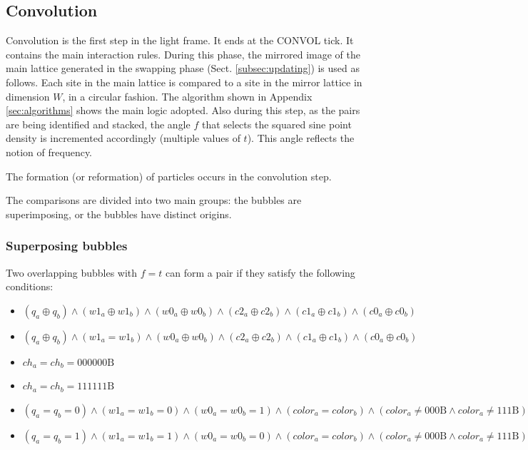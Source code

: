 \documentclass[12pt,english]{article}
\begin{document}
\subsection{Convolution} \label{subsec:convolution}
Convolution is the first step in the light frame. It ends at the CONVOL tick. It contains the main interaction rules. During this phase, the mirrored image of the main lattice generated in the swapping phase (Sect. \ref{subsec:updating}) is used as follows. Each site in the main lattice is compared to a site in the mirror lattice in dimension $W$, in a circular fashion. The algorithm shown in Appendix \ref{sec:algorithms} shows the main logic adopted. Also during this step, as the pairs are being identified and stacked, the angle $f$ that selects the squared sine point density is incremented accordingly (multiple values of $t$). This angle reflects the notion of frequency.

The formation (or reformation) of particles occurs in the convolution step.

The comparisons are divided into two main groups: the bubbles are superimposing, or the bubbles have distinct origins.

\subsubsection{Superposing bubbles}
Two overlapping bubbles with $f=t$ can form a pair if they satisfy the following conditions:
\begin{itemize}
\item
$ (q_a \oplus q_b) \land (w1_a \oplus w1_b) \land (w0_a \oplus w0_b) \land (c2_a \oplus c2_b) \land (c1_a \oplus c1_b) \land (c0_a \oplus c0_b) $
\item

$ (q_a \oplus q_b) \land (w1_a = w1_b) \land (w0_a \oplus w0_b) \land (c2_a \oplus c2_b) \land (c1_a \oplus c1_b) \land (c0_a \oplus c0_b) $
\item

$ ch_a = ch_b = 000000\mathrm{B} $
\item

$ ch_a = ch_b = 111111\mathrm{B} $
\item

$ (q_a = q_b = 0) \land (w1_a = w1_b = 0) \land (w0_a = w0_b = 1) \land (color_a = color_b) \land (color_a \neq 000\mathrm{B} \land color_a \neq 111\mathrm{B}) $
\item

$ (q_a = q_b = 1) \land (w1_a = w1_b = 1) \land (w0_a = w0_b = 0) \land (color_a = color_b) \land (color_a \neq 000\mathrm{B} \land color_a \neq 111\mathrm{B}) $

\end{itemize}
\end{document}
